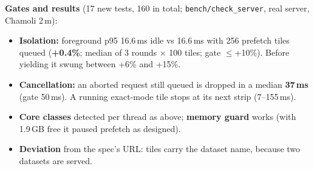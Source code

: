 ﻿\documentclass[11pt,a4paper]{article}
\newcommand{\code}[1]{\texttt{#1}}
\begin{document}
\textbf{Gates and results} (17 new tests, 160 in total; \code{bench/check\_server}, real server, Chamoli 2\,m):
\begin{itemize}
  \item \textbf{Isolation:} foreground p95 16.6\,ms idle vs 16.6\,ms with 256 prefetch tiles queued (\textbf{+0.4\%};
  median of 3 rounds $\times$ 100 tiles; gate $\leq$+10\%). Before yielding it swung between +6\% and +15\%.
  \item \textbf{Cancellation:} an aborted request still queued is dropped in a median \textbf{37\,ms} (gate 50\,ms). A
  running exact-mode tile stops at its next strip (7--155\,ms).
  \item \textbf{Core classes} detected per thread as above; \textbf{memory guard} works (with 1.9\,GB free it paused
  prefetch as designed).
  \item \textbf{Deviation} from the spec's URL: tiles carry the dataset name, because two datasets are served.
\end{itemize}
\end{document}
